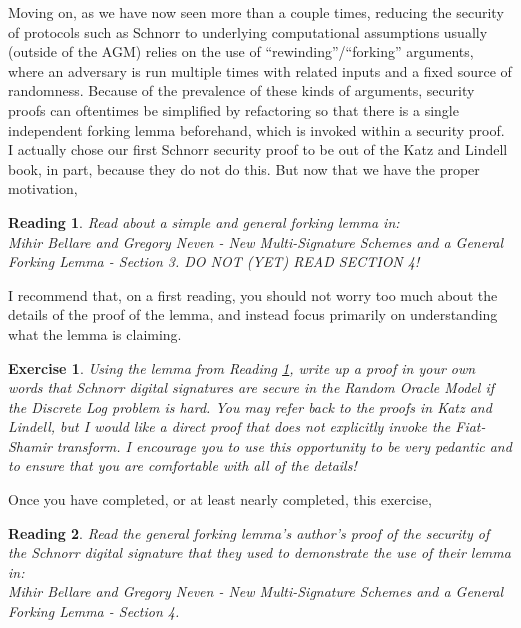 \documentclass[12pt]{article}
\newtheorem{exercise}{Exercise}
\newtheorem{reading}{Reading}
\theoremstyle{definition}
\theoremstyle{remark}
\theoremstyle{definition}
\begin{document}
Moving on, as we have now seen more than a couple times, reducing the security of protocols such as Schnorr to underlying computational assumptions usually (outside of the AGM) relies on the use of ``rewinding''/``forking'' arguments, where an adversary is run multiple times with related inputs and a fixed source of randomness. Because of the prevalence of these kinds of arguments, security proofs can oftentimes be simplified by refactoring so that there is a single independent forking lemma beforehand, which is invoked within a security proof.\\

I actually chose our first Schnorr security proof to be out of the Katz and Lindell book, in part, because they do not do this. But now that we have the proper motivation,

\begin{reading}\label{forking}
Read about a simple and general forking lemma in:\\
Mihir Bellare and Gregory Neven - New Multi-Signature Schemes and a General Forking Lemma - Section 3. DO NOT (YET) READ SECTION 4!
\end{reading}

I recommend that, on a first reading, you should not worry too much about the details of the proof of the lemma, and instead focus primarily on understanding what the lemma is claiming.

\begin{exercise}
Using the lemma from Reading \ref{forking}, write up a proof in your own words that Schnorr digital signatures are secure in the Random Oracle Model if the Discrete Log problem is hard. You may refer back to the proofs in Katz and Lindell, but I would like a direct proof that does not explicitly invoke the Fiat-Shamir transform. I encourage you to use this opportunity to be very pedantic and to ensure that you are comfortable with all of the details!
\end{exercise}

Once you have completed, or at least nearly completed, this exercise,

\begin{reading}\label{Schnorr}
Read the general forking lemma's author's proof of the security of the Schnorr digital signature that they used to demonstrate the use of their lemma in:\\
Mihir Bellare and Gregory Neven - New Multi-Signature Schemes and a General Forking Lemma - Section 4.
\end{reading}
\end{document}

